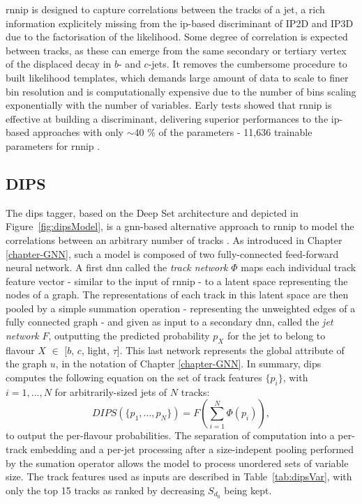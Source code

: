 \gls{rnnip} is designed to capture correlations between the tracks of a jet, a rich information explicitely missing from the \gls{ip}-based discriminant of IP2D and IP3D due to the factorisation of the likelihood. Some degree of correlation is expected between tracks, as these can emerge from the same secondary or tertiary vertex of the displaced decay in $b$- and $c$-jets. It removes the cumbersome procedure to built likelihood templates, which demands large amount of data to scale to finer bin resolution and is computationally expensive due to the number of bins scaling exponentially with the number of variables. Early tests showed that \gls{rnnip} is effective at building a discriminant, delivering superior performances to the \gls{ip}-based approaches with only $\sim$40 \% of the parameters - 11,636 trainable parameters for \gls{rnnip} \cite{Paganini:2289214}.

\subsection{DIPS}
The \gls{dips} tagger, based on the Deep Set architecture \cite{NIPS2017f22e4747} and depicted in Figure~\ref{fig:dipsModel}, is a \gls{gnn}-based alternative approach to \gls{rnnip} to model the correlations between an arbitrary number of tracks \cite{ATL-PHYS-PUB-2020-014}. As introduced in Chapter \ref{chapter-GNN}, such a model is composed of two fully-connected feed-forward neural network. A first \gls{dnn} called the \textit{track network} $\Phi$ maps each individual track feature vector - similar to the input of \gls{rnnip} - to a latent space representing the nodes of a graph. The representations of each track in this latent space are then pooled by a simple summation operation - representing the unweighted edges of a fully connected graph - and given as input to a secondary \gls{dnn}, called the \textit{jet network} $F$, outputting the predicted probability $p_X$ for the jet to belong to flavour $X$ $\in$ [$b$, $c$, light, $\tau$]. This last network represents the global attribute of the graph $u$, in the notation of Chapter \ref{chapter-GNN}. 
In summary, \gls{dips} computes the following equation on the set of track features $\{ p_i \}$, with $i = 1, ..., N$ for arbitrarily-sized jets of $N$ tracks:
\begin{equation}
  DIPS( \{p_1, ..., p_N \} ) = F\left( \sum_{i=1}^N \Phi(p_i) \right),
\end{equation}
to output the per-flavour probabilities. The separation of computation into a per-track embedding and a per-jet processing after a size-indepent pooling performed by the sumation operator allows the model to process unordered sets of variable size. The track features used as inputs are described in Table~\ref{tab:dipsVar}, with only the top 15 tracks as ranked by decreasing $S_{d_0}$ being kept.

